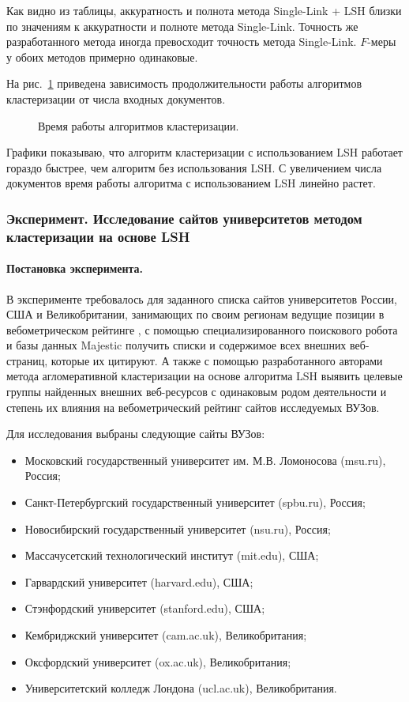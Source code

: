 Как видно из таблицы, аккуратность и полнота метода Single-Link + LSH близки по значениям к аккуратности и полноте метода Single-Link. Точность же разработанного метода иногда превосходит точность метода Single-Link. \(F\)-меры у обоих методов примерно одинаковые.

На рис.~\cref{fig:clasterizationTime} приведена зависимость продолжительности работы алгоритмов кластеризации от числа входных документов.

\begin{figure}[ht]
	\caption{Время работы алгоритмов кластеризации.}\label{fig:clasterizationTime}
\end{figure}

Графики показываю, что алгоритм кластеризации с использованием LSH работает гораздо быстрее, чем алгоритм без использования LSH. С увеличением числа документов время работы алгоритма с использованием LSH линейно растет.

\subsubsection{Эксперимент. Исследование сайтов университетов методом кластеризации на основе LSH}
\paragraph{Постановка эксперимента.} В эксперименте требовалось для заданного списка сайтов университетов России, США и Великобритании, занимающих по своим регионам ведущие позиции в вебометрическом рейтинге \cite{RankingWeb}, с помощью специализированного поискового робота \cite{BlekanovSergeevMartynenko} и базы данных Majestic \cite{Majestic} получить списки и содержимое всех внешних веб-страниц, которые их цитируют. А также с помощью разработанного авторами метода агломеративной кластеризации на основе алгоритма LSH выявить целевые группы найденных внешних веб-ресурсов с одинаковым родом деятельности и степень их влияния на вебометрический рейтинг сайтов исследуемых ВУЗов.

Для исследования выбраны следующие сайты ВУЗов:
\begin{itemize}
	\item Московский государственный университет им. М.В. Ломоносова (msu.ru), Россия;
	\item Санкт-Петербургский государственный университет (spbu.ru), Россия;
	\item Новосибирский государственный университет (nsu.ru), Россия;
	\item Массачусетский технологический институт (mit.edu), США;
	\item Гарвардский университет (harvard.edu), США;
	\item Стэнфордский университет (stanford.edu), США;
	\item Кембриджский университет (cam.ac.uk), Великобритания;
	\item Оксфордский университет (ox.ac.uk), Великобритания;
	\item Университетский колледж Лондона (ucl.ac.uk), Великобритания.
\end{itemize}

